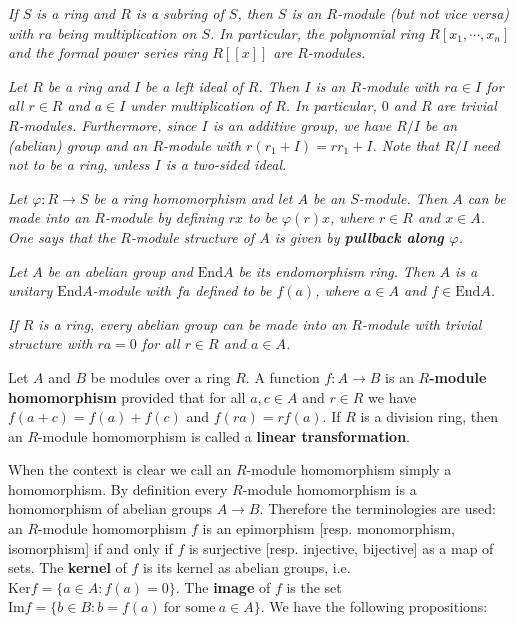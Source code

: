 \begin{example}\em
If $S$ is a ring and $R$ is a subring of $S$, then $S$ is an $R$-module (but not vice versa) with $ra$ being multiplication on $S$. In particular, the polynomial ring $R[x_1,\cdots,x_n]$ and the formal power series ring $R[[x]]$ are $R$-modules.
\end{example}
\begin{example}\em
Let $R$ be a ring and $I$ be a left ideal of $R$. Then $I$ is an $R$-module with $ra\in I$ for all $r\in R$ and $a\in I$ under multiplication of $R$. In particular, $0$ and $R$ are trivial $R$-modules. Furthermore, since $I$ is an additive group, we have $R/I$ be an (abelian) group and an $R$-module with $r(r_1+I)=rr_1+I$. Note that $R/I$ need not to be a ring, unless $I$ is a two-sided ideal.
\end{example}
\begin{example}\em
Let $\varphi:R\to S$ be a ring homomorphism and let $A$ be an $S$-module. Then $A$ can be made into an $R$-module by defining $rx$ to be $\varphi(r)x$, where $r\in R$ and $x\in A$. One says that the $R$-module structure of $A$ is given by \textbf{pullback along $\varphi$}.
\end{example}
\begin{example}\em
Let $A$ be an abelian group and $\mathrm{End}A$ be its endomorphism ring. Then $A$ is a unitary $\mathrm{End}A$-module with $fa$ defined to be $f(a)$, where $a\in A$ and $f\in\mathrm{End}A$.
\end{example}
\begin{example}\em
If $R$ is a ring, every abelian group can be made into an $R$-module with trivial structure with $ra=0$ for all $r\in R$ and $a\in A$.
\end{example}
\begin{definition}
Let $A$ and $B$ be modules over a ring $R$. A function $f:A\to B$ is an \textbf{$R$-module homomorphism} provided that for all $a,c\in A$ and $r\in R$ we have $f(a+c)=f(a)+f(c)$ and $f(ra)=rf(a)$. If $R$ is a division ring, then an $R$-module homomorphism is called a \textbf{linear transformation}.
\end{definition}
When the context is clear we call an $R$-module homomorphism simply a homomorphism. By definition every $R$-module homomorphism is a homomorphism of abelian groups $A\to B$. Therefore the terminologies are used: an $R$-module homomorphism $f$ is an epimorphism [resp. monomorphism, isomorphism] if and only if $f$ is surjective [resp. injective, bijective] as a map of sets. The \textbf{kernel} of $f$ is its kernel as abelian groups, i.e. $\mathrm{Ker}f=\{a\in A:f(a)=0\}$. The \textbf{image} of $f$ is the set $\mathrm{Im}f=\{b\in B:b=f(a)\ \text{for some}\ a\in A\}$. We have the following propositions:
